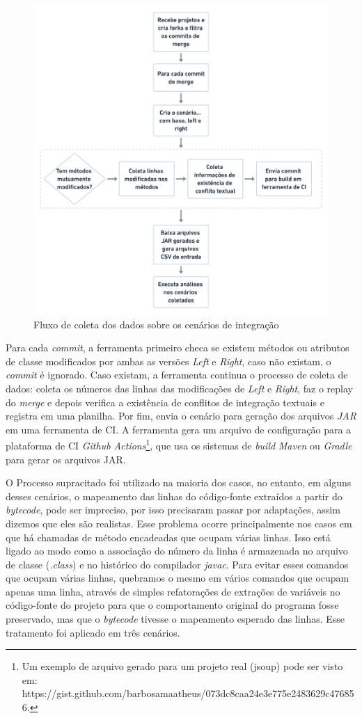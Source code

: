 \begin{figure}[!h]
    \centering
    \includegraphics[width=0.8\linewidth]{images/FluxodeMineracao.png}
    \caption{Fluxo de coleta dos dados sobre os cenários de integração}
    \label{fig:mineracao}
\end{figure}

Para cada \emph{commit}, a ferramenta primeiro checa se existem métodos ou atributos de classe modificados por ambas as versões \emph{Left} e \emph{Right}, caso não existam, o \emph{commit} é ignorado. Caso existam, a ferramenta continua o processo de coleta de dados: coleta os números das linhas das modificações de \emph{Left} e \emph{Right}, faz o replay do \emph{merge} e depois verifica a existência de conflitos de integração textuais e registra em uma planilha. Por fim, envia o cenário para geração dos arquivos \emph{JAR} em uma ferramenta de CI. A ferramenta gera um arquivo de configuração para a plataforma de CI \emph{Github Actions}\footnote{Um exemplo de arquivo gerado para um projeto real (jsoup) pode ser visto em: https://gist.github.com/barbosamaatheus/073dc8caa24e3e775e2483629c476856.
}, que usa os sistemas de \emph{build} \emph{Maven} ou \emph{Gradle} para gerar os arquivos JAR.


O Processo supracitado foi utilizado na maioria dos casos, no entanto, em alguns desses cenários, o mapeamento das linhas do código-fonte extraídos a partir do \emph{bytecode}, pode ser impreciso, por isso precisaram passar por adaptações, assim dizemos que eles são realistas. Esse problema ocorre principalmente nos casos em que há chamadas de método encadeadas que ocupam várias linhas. Isso está ligado ao modo como a associação do número da linha é armazenada no arquivo de classe (\emph{.class}) e no histórico do compilador \emph{javac}. Para evitar esses comandos que ocupam várias linhas, quebramos o mesmo em vários comandos que ocupam apenas uma linha, através de simples refatorações de extrações de variáveis no código-fonte do projeto para que o comportamento original do programa fosse preservado, mas que o \emph{bytecode} tivesse o mapeamento esperado das linhas. Esse tratamento foi aplicado em três cenários.

